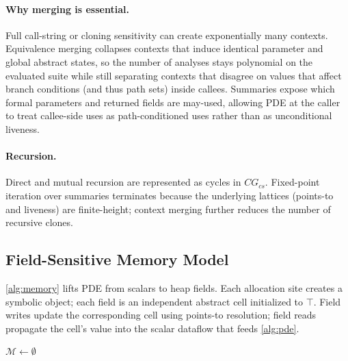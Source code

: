 \documentclass[acmsmall,screen,review,anonymous]{acmart}
\begin{document}
\paragraph{Why merging is essential.}
Full call-string or cloning sensitivity can create exponentially many contexts. Equivalence merging collapses contexts that induce identical parameter and global abstract states, so the number of analyses stays polynomial on the evaluated suite while still separating contexts that disagree on values that affect branch conditions (and thus path sets) inside callees. Summaries expose which formal parameters and returned fields are may-used, allowing PDE at the caller to treat callee-side uses as path-conditioned uses rather than as unconditional liveness.

\paragraph{Recursion.}
Direct and mutual recursion are represented as cycles in $CG_{cs}$. Fixed-point iteration over summaries terminates because the underlying lattices (points-to and liveness) are finite-height; context merging further reduces the number of recursive clones.

\subsection{Field-Sensitive Memory Model}
\autoref{alg:memory} lifts PDE from scalars to heap fields. Each allocation site creates a symbolic object; each field is an independent abstract cell initialized to $\top$. Field writes update the corresponding cell using points-to resolution; field reads propagate the cell's value into the scalar dataflow that feeds \autoref{alg:pde}.

\begin{algobox}
\begin{algorithm}[H]
\SetAlgoLined
{}
$\mathcal{M}\leftarrow\emptyset$\;
\;
\caption{Field-sensitive memory modeling.}
\label{alg:memory}
\end{algorithm}
\end{algobox}
\end{document}
